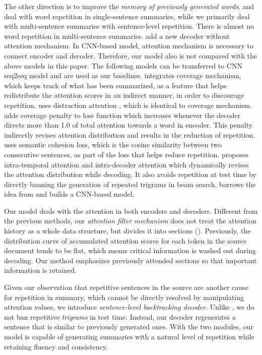 The other direction is to improve the 
{\em memory of previously generated words}.
\cite{SuzukiN17} and \cite{LinSMS18} 
deal with word repetition in single-sentence summaries, 
while we primarily deal with multi-sentence summaries with 
sentence-level repetition. 
There is almost no word repetition in multi-sentence summaries.
\cite{JiangB18} add a new decoder without attention mechanism.
In CNN-based model, attention mechanism is necessary to connect encoder 
and decoder.
Therefore, our model also is not compared with the above models in this paper. 
The following models can be transferred to CNN seq2seq model and
are used as our baselines.
\cite{SeeLM17} integrates coverage mechanism, 
which keeps track of what has been summarized, as a feature that helps 
redistribute the attention scores in an indirect manner,
in order to discourage repetition. 
\cite{TanWX17} uses distraction attention
\citep{ChenZLWJ16}, which is identical to coverage mechanism. 
\cite{GehrmannDR18} adds coverage penalty to loss function
which increases whenever the decoder directs more than 1.0 of total attention
towards a word in encoder.
This penalty indirectly revises attention distribution and results in
the reduction of repetition.
\cite{elikyilmazBHC18} uses semantic cohesion loss,
which is the cosine similarity between two consecutive sentences, as part of
the loss that helps reduce repetition.
\cite{PaulusXS17} proposes intra-temporal attention \citep{NallapatiZSGX16} and 
intra-decoder attention which dynamically revises the attention distribution while decoding. 
It also avoids repetition at test time by directly banning the generation of 
repeated trigrams in beam search. 
\cite{FanGA18} borrows the idea from \cite{PaulusXS17} and 
builds a CNN-based model. 

Our model deals with the attention in both encoders and decoders. 
Different from the previous methods, 
our \textit{attention filter mechanism} does not 
treat the attention history as a whole data structure,  
but divides it into sections (). 
Previously, the distribution curve of accumulated attention scores 
for each token in the source document tends to be flat, 
which means critical information is washed out during decoding.
Our method emphasizes previously attended sections 
so that important information is retained.

Given our observation that repetitive sentences in the source are
another cause for repetition in summary, 
which cannot be directly resolved by manipulating attention values, 
we introduce \textit{sentence-level backtracking decoder}. 
Unlike \cite{PaulusXS17}, 
we do not ban repetitive \textit{trigrams} in test time. 
Instead, our decoder regenerates a sentence that is similar to previously generated ones.
With the two modules, our model is capable of generating summaries with a
natural level of repetition while retaining fluency and consistency.


